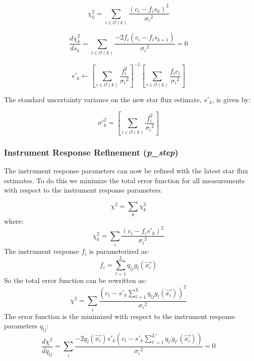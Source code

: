 \documentclass[manuscript]{aastex}
\begin{document}
\begin{displaymath}
\chi^2_{k} = \sum_{i \in \mathcal{O}(k)} \frac{(c_i-f_{i}s_{k})^2}{{\sigma_i}^2}
\end{displaymath}

\begin{displaymath}
\frac{d\chi^2_{k}}{d s_{k}} = \sum_{i \in \mathcal{O}(k)} \frac{-2 f_{i} (c_i-f_{i}s_{k+1})}{{\sigma_i}^2} = 0
\end{displaymath}

\begin{displaymath}
s'_{k} \leftarrow \left[{\sum_{i \in \mathcal{O}(k)}  \frac{f_{i}^2}{{\sigma_i}^2}} \right]^{-1}  \left[ {\sum_{i \in \mathcal{O}(k)} \frac{f_{i} c_i}{{\sigma_i}^2}} \right]
\end{displaymath}

The standard uncertainty variance on the new star flux estimate, $s'_{k}$, is given by:

\begin{displaymath}
\sigma'^2_k = \left[{\sum_{i \in \mathcal{O}(k)}  \frac{f_{i}^2}{{\sigma_i}^2}} \right]
\end{displaymath}


\subsubsection{Instrument Response Refinement (\textit{p\_step})}
The instrument response parameters can now be refined with the latest star flux estimates. To do this we minimize the total error function for all measurements with respect to the instrument response parameters.

\begin{displaymath}
\chi^2 = \sum_{k} \chi^2_k
\end{displaymath}
where:
\begin{displaymath}
\chi^2_k = \sum_{i} \frac{(c_i-f_{i}s'_{k})^2}{{\sigma_i}^2}
\end{displaymath}
The instrument response $f_i$ is parameterized as:
\begin{displaymath}
f_{i} = \sum_{l = 1}^L q_{lj} g_l(\vec{x_i})
\end{displaymath}
So the total error function can be rewritten as:
\begin{displaymath}
\chi^2 = \sum_{i} \frac{(c_i- s'_{k} \sum_{l = 1}^L q_{lj} g_l(\vec{x_i}))^2}{{\sigma_i}^2}
\end{displaymath}
The error function is the minimized with respect to the instrument response parameters $q_{lj}$:
\begin{displaymath}
\frac{d\chi^2}{dq_{lj}} = \sum_{i} \frac{-2 g_l(\vec{x_i}) s'_{k} (c_i- s'_{k} \sum_{l' = 1}^{L'} q_{l'} g_{l'}(\vec{x_i}))}{{\sigma_i}^2} = 0
\end{displaymath}
\end{document}
